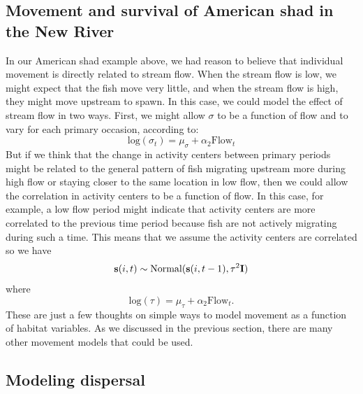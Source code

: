 \subsection{Movement and survival of American shad in the New River}

In our American shad example above, we had reason to believe
that individual movement is directly related to stream flow.  When the
stream flow is low,
we might expect that the fish move very little, and when the stream
flow is high, they might
move upstream to spawn. In this case,
we could model the effect of stream flow in two ways.  First, we might allow $\sigma$
to be a function of flow and to vary for each primary occasion, according to:
\[
 \mbox{log}(\sigma_t) = \mu_{\sigma} + \alpha_2 \mbox{Flow}_t
\]
But if we think that the change in activity centers between primary periods might be related to the
general pattern of fish migrating upstream more during high flow or staying closer to the same location
in low flow, then we could allow the correlation in activity centers to be a function of flow.  In this
case, for example, a low flow period might indicate that activity centers are more correlated to the previous
time period because fish are not actively migrating during such a time.
This means that we assume the
activity centers are correlated so we have
\[
{\bf s}(i,t) \sim \mbox{Normal}({\bf
  s}(i,t-1), \tau^{2} {\bf I})
\]
where
\[
\mbox{log}(\tau) = \mu_{\tau} + \alpha_2 \mbox{Flow}_t.
\]
These are just a few thoughts on simple ways to model movement as a
function of habitat variables.
As we discussed in the previous section, there
are many other movement models that could be used.

\subsection{Modeling  dispersal}

